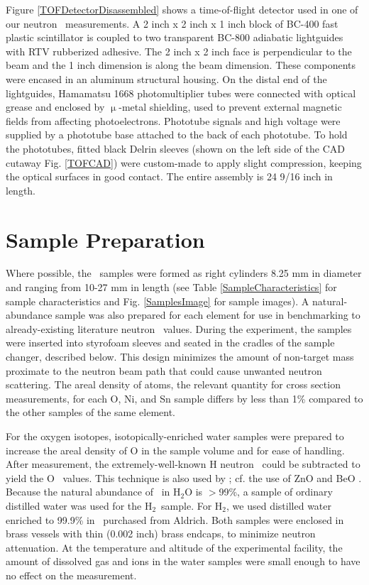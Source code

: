 Figure \ref{TOFDetectorDisassembled} shows a time-of-flight detector used in one
of our neutron \tot\ measurements. A 2 inch x 2 inch x 1 inch block of BC-400 fast
plastic scintillator is coupled to two transparent
BC-800 adiabatic lightguides with RTV rubberized adhesive. The 2 inch x 2 inch face is perpendicular
to the beam and the 1 inch dimension is along the beam dimension. These components were encased
in an aluminum structural housing. On the distal end of the lightguides, Hamamatsu 1668
photomultiplier tubes were connected with optical grease and enclosed by
$\upmu$-metal shielding, used to prevent external magnetic fields from affecting photoelectrons.
Phototube signals and high voltage were supplied by a phototube base attached to the back of each
phototube. To hold the phototubes, fitted black Delrin sleeves (shown on the
left side of the CAD cutaway Fig. \ref{TOFCAD}) were custom-made to apply slight
compression, keeping the optical surfaces in good contact. The entire assembly
is 24 9/16 inch in length.

\section{Sample Preparation}
Where possible, the \tot\ samples were formed as right
cylinders 8.25 mm in diameter and ranging from 10-27 mm in length (see
Table \ref{SampleCharacteristics} for sample characteristics and Fig. \ref{SamplesImage}
for sample images). A natural-abundance sample
was also prepared for each element for use in benchmarking to already-existing
literature neutron \tot\ values. During the experiment, the samples were inserted
into styrofoam sleeves and seated in the cradles of the sample
changer, described below. This design minimizes the amount of non-target mass proximate to the
neutron beam path that could cause unwanted neutron scattering. The areal density of atoms,
the relevant quantity for cross section measurements, for each O, Ni, and Sn sample differs by less than 1\%
compared to the other samples of the same element.

For the oxygen isotopes, isotopically-enriched water samples were prepared to
increase the areal density of O in the sample volume and for ease of handling.
After measurement, the
extremely-well-known H neutron \tot\ could be subtracted to yield the O \tot\ values.
This technique is also used by \cite{Vaughn1965, Salisbury1965}; cf. 
the use of ZnO and BeO \cite{Finlay1993}.
Because the natural abundance of \oSix\ in H$_{2}$O is $>$99\%, a sample of
ordinary distilled water was used for the H$_{2}$\oSix\ sample. For H$_{2}$\oEight,
we used distilled water enriched to 99.9\% in \oEight\, purchased from
Aldrich. Both samples were enclosed in brass vessels with thin
(0.002 inch) brass endcaps, to minimize neutron attenuation. At the temperature and
altitude of the experimental facility, the amount of dissolved gas and ions
in the water samples were small enough to have no effect on the measurement.

